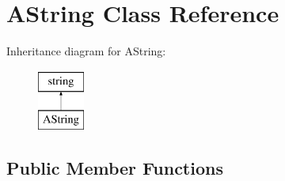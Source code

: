\hypertarget{class_a_string}{}\section{A\+String Class Reference}
\label{class_a_string}
Inheritance diagram for A\+String\+:\begin{figure}[H]
\begin{center}
\leavevmode
\includegraphics[height=2.000000cm]{class_a_string}
\end{center}
\end{figure}
\subsection*{Public Member Functions}
